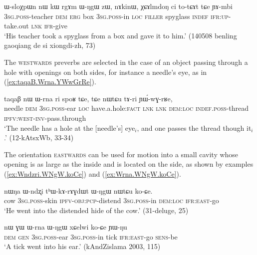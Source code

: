 \begin{exe}
\ex \label{ex:rgAm.WNgW.totCAt}
\gll ɯ-sloχpɯn nɯ kɯ rgɤm ɯ-ŋgɯ zɯ, nɤkinɯ, χɕɤlmdoŋ ci to-tɕɤt tɕe ɲɤ-mbi \\
\textsc{3sg}.\textsc{poss}-teacher \textsc{dem} \textsc{erg} box \textsc{3sg}.\textsc{poss}-in \textsc{loc} \textsc{filler} spyglass \textsc{indef} \textsc{ifr}:\textsc{up}-take.out \textsc{lnk} \textsc{ifr}-give \\
\glt `His teacher took a spyglass from a box and gave it to him.' (140508 benling gaoqiang de si xiongdi-zh, 73)
\end{exe}

The \textsc{westwards} preverbs are selected in the case of an object passing through a hole with openings on both sides, for instance a needle's eye, as in (\ref{ex:taqaB.Wrna.YWwGrRe}).

\begin{exe}
\ex \label{ex:taqaB.Wrna.YWwGrRe}
\gll taqaβ nɯ ɯ-rna ri spoʁ tɕe, tɕe nɯtɕu tɤ-ri ɲɯ́-wɣ-rʁe, \\
needle \textsc{dem} \textsc{3sg}.\textsc{poss}-ear \textsc{loc} have.a.hole:\textsc{fact} \textsc{lnk} \textsc{lnk} \textsc{dem}:\textsc{loc} \textsc{indef}.\textsc{poss}-thread \textsc{ipfv}:\textsc{west}-\textsc{inv}-pass.through \\
\glt `The needle has a hole at the [needle's] eye$_i$, and one passes the thread though it$_i$.' (12-kAtsxWb, 33-34)
\end{exe}

The orientation \textsc{eastwards} can be used for motion into a small cavity whose opening is as large as the inside and is located on the side, as shown by examples (\ref{ex:Wndzri.WNgW.koCe}) and (\ref{ex:Wrna.WNgW.koCe}).

\begin{exe}
\ex \label{ex:Wndzri.WNgW.koCe}
\gll nɯŋa ɯ-ndʐi tʰɯ-kɤ-rɤɣdɯt ɯ-ŋgɯ nɯtɕu ko-ɕe. \\
cow \textsc{3sg}.\textsc{poss}-skin \textsc{ipfv}-\textsc{obj}:\textsc{pcp}-distend \textsc{3sg}.\textsc{poss}-in \textsc{dem}:\textsc{loc} \textsc{ifr}:\textsc{east}-go \\
\glt `He went into the distended hide of the cow.' (31-deluge, 25)
\end{exe}

\begin{exe}
\ex \label{ex:Wrna.WNgW.koCe}
\gll nɯ ɣɯ ɯ-rna ɯ-ŋgɯ xɕelwi ko-ɕe ɲɯ-ŋu \\
\textsc{dem} \textsc{gen} \textsc{3sg}.\textsc{poss}-ear \textsc{3sg}.\textsc{poss}-in tick \textsc{ifr}:\textsc{east}-go \textsc{sens}-be \\
\glt `A tick went into his ear.' (kAndZislama 2003, 115)
\end{exe}

